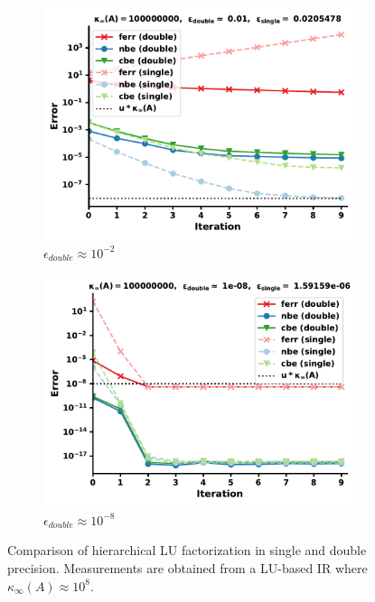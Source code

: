 \begin{figure}[h]
\centering
\begin{subfigure}{.5\textwidth}
  \centering
  \includegraphics[width=\linewidth]{chapters/5_experiments/figures/LU512_e3_0s.pdf}
  \caption{$\epsilon_{double} \approx 10^{-2}$}
  \label{fig:lrirs4_1}
\end{subfigure}%
\begin{subfigure}{.5\textwidth}
  \centering
  \includegraphics[width=\linewidth]{chapters/5_experiments/figures/LU512_e3_1s.pdf}
  \caption{$\epsilon_{double} \approx 10^{-8}$}
  \label{fig:lrirs4_2}
\end{subfigure}
\caption[Mixed Precision Low-Rank LU-IR 4]{Comparison of hierarchical LU factorization in single and double precision. Measurements are obtained from a LU-based IR where $\kappa_\infty(A) \approx 10^8$.}
\label{fig:lrirs4}
\end{figure}

